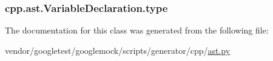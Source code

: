 \subsubsection[{\texorpdfstring{type}{type}}]{\setlength{\rightskip}{0pt plus 5cm}cpp.\+ast.\+Variable\+Declaration.\+type}\hypertarget{classcpp_1_1ast_1_1VariableDeclaration_a8c7cc8578ea12f93c6e1c5c6ef4ddf99}{}\label{classcpp_1_1ast_1_1VariableDeclaration_a8c7cc8578ea12f93c6e1c5c6ef4ddf99}


The documentation for this class was generated from the following file\+:\begin{DoxyCompactItemize}
\item 
vendor/googletest/googlemock/scripts/generator/cpp/\hyperlink{ast_8py}{ast.\+py}\end{DoxyCompactItemize}
